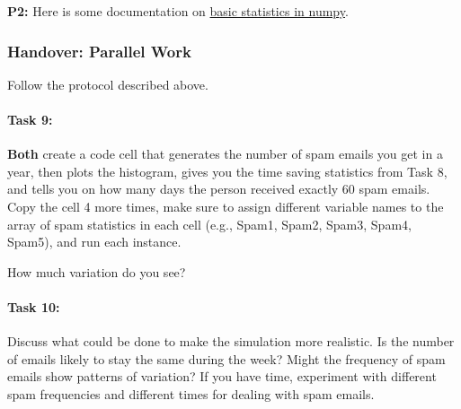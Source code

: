 \documentclass{article}
\begin{document}
\textbf{P2:} Here is some documentation on \href{http://docs.scipy.org/doc/numpy/reference/routines.statistics.html}{basic statistics in numpy}.

\subsubsection{Handover: Parallel Work}
Follow the protocol described above. 

\paragraph{Task 9:} \textbf{Both} create a code cell that generates the number of spam emails you get in a year, then plots the histogram, gives you the time saving statistics from Task 8, and tells you on how many days the person received exactly 60 spam emails. Copy the cell 4 more times, make sure to assign different variable names to the array of spam statistics in each cell (e.g., Spam1, Spam2, Spam3, Spam4, Spam5), and run each instance.  

How much variation do you see? 

\paragraph{Task 10:} Discuss what could be done to make the simulation more realistic.  Is the number of emails likely to stay the same during the week? Might the frequency of spam emails show patterns of variation? If you have time, experiment with different spam frequencies and different times for dealing with spam emails. 
\end{document}
